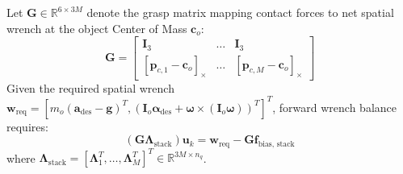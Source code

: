 Let $\mathbf{G} \in \mathbb{R}^{6 \times 3M}$ denote the grasp matrix mapping contact forces to net spatial wrench at the object Center of Mass $\mathbf{c}_o$:
\begin{equation}
    \mathbf{G} = \begin{bmatrix} \mathbf{I}_3 & \dots & \mathbf{I}_3 \\ [\mathbf{p}_{c, 1} - \mathbf{c}_o]_\times & \dots & [\mathbf{p}_{c, M} - \mathbf{c}_o]_\times \end{bmatrix}
\end{equation}
Given the required spatial wrench $\mathbf{w}_{\text{req}} = [m_o (\mathbf{a}_{\text{des}} - \mathbf{g})^T, (\mathbf{I}_o \boldsymbol{\alpha}_{\text{des}} + \boldsymbol{\omega} \times (\mathbf{I}_o \boldsymbol{\omega}))^T]^T$, forward wrench balance requires:
\begin{equation}
    \left( \mathbf{G} \mathbf{\Lambda}_{\text{stack}} \right) \mathbf{u}_k = \mathbf{w}_{\text{req}} - \mathbf{G} \mathbf{f}_{\text{bias, stack}}
    \label{eq:wrench_eq}
\end{equation}
where $\mathbf{\Lambda}_{\text{stack}} = [\mathbf{\Lambda}_1^T, \dots, \mathbf{\Lambda}_M^T]^T \in \mathbb{R}^{3M \times n_q}$.


